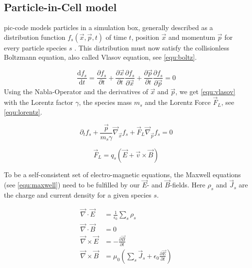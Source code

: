 \documentclass[bachelor_thesis]{subfiles}
\begin{document}
\subsection{Particle-in-Cell model} \label{chap:pic}
\Gls{pic}-code models particles in a simulation box, generally described as a distribution function $f_s(\vec{x}, \vec{p}, t)$ of time $t$, position $\vec{x}$ and momentum $\vec{p}$ for every particle species $s$ \cite{PICRepo}.
This distribution must now satisfy the collisionless Boltzmann equation, also called Vlasov equation\cite{Vlasov1968}, see \autoref{equ:boltz}.

\begin{equation}
	\frac{\mathrm{d}f_s}{\mathrm{d}t}=\frac{\partial f_s}{\partial t} + \frac{\partial \vec{x}}{\partial t} \frac{\partial f_s}{\partial \vec{x}} + \frac{\partial \vec{p}}{\partial t} \frac{\partial f_s}{\partial \vec{p}} = 0
	\label{equ:boltz}
\end{equation}
Using the Nabla-Operator and the derivatives of $\vec{x}$ and $\vec{p}$, we get \autoref{equ:vlasov} with the Lorentz factor $\gamma$, the species mass $m_s$ and the Lorentz Force $\vec{F}_L$, see \autoref{equ:lorentz}.

\begin{equation}
	\partial_t f_s + \frac{\vec{p}}{m_s \gamma} \vec{\nabla}_{\vec{x}} f_s + \vec{F}_L \vec{\nabla}_{\vec{p}} f_s = 0
	\label{equ:vlasov}
\end{equation}

\begin{equation}
	\vec{F}_L=q_s\left(\vec{E}+\vec{v}\times\vec{B}\right)
	\label{equ:lorentz}
\end{equation}

To be a self-consistent set of electro-magnetic equations, the Maxwell equations (see \autoref{equ:maxwell}) need to be fulfilled by our $\vec{E}$- and $\vec{B}$-fields. Here $\rho_s$ and $\vec{J}_s$ are the charge and current density for a given species $s$.

\begin{equation}
\begin{aligned}
	\vec{\nabla}\cdotp\vec{E}  &= \frac{1}{\epsilon_0}\sum_s \rho_s 									\\
	\vec{\nabla}\cdotp\vec{B}  &= 0 														\\
	\vec{\nabla}\times\vec{E} &= -\frac{\partial \vec{B}}{\partial t}									\\
	\vec{\nabla}\times\vec{B}&= \mu_0 \left(\sum_s \vec{J}_s + \epsilon_0 \frac{\partial \vec{E}}{\partial t}\right)	
\end{aligned}
\label{equ:maxwell}
\end{equation}
\end{document}
